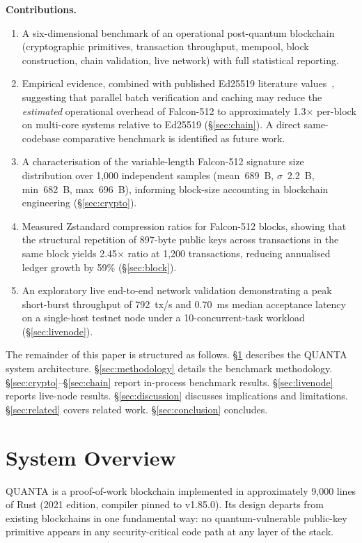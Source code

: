 \documentclass[11pt,a4paper]{article}
\begin{document}
\textbf{Contributions.}
\begin{enumerate}
  \item A six-dimensional benchmark of an operational post-quantum blockchain
        (cryptographic primitives, transaction throughput, mempool, block
        construction, chain validation, live network) with full statistical
        reporting.
  \item Empirical evidence, combined with published Ed25519 literature values~\cite{bernstein2012}, suggesting that parallel batch verification and caching may reduce the \emph{estimated} operational overhead of Falcon-512 to approximately 1.3$\times$ per-block on multi-core systems relative to Ed25519 (\S\ref{sec:chain}). A direct same-codebase comparative benchmark is identified as future work.
  \item A characterisation of the variable-length Falcon-512 signature size
        distribution over 1,000 independent samples (mean~689~B, $\sigma$~2.2~B,
        min~682~B, max~696~B), informing block-size accounting in blockchain
        engineering (\S\ref{sec:crypto}).
  \item Measured Zstandard compression ratios for Falcon-512 blocks, showing
        that the structural repetition of 897-byte public keys across
        transactions in the same block yields 2.45$\times$ ratio at 1,200
        transactions, reducing annualised ledger growth by 59\% (\S\ref{sec:block}).
  \item An exploratory live end-to-end network validation demonstrating a peak short-burst throughput of 792~tx/s and 0.70~ms median acceptance latency on a single-host testnet node under a 10-concurrent-task workload (\S\ref{sec:livenode}).
\end{enumerate}

The remainder of this paper is structured as follows.
\S\ref{sec:system} describes the QUANTA system architecture.
\S\ref{sec:methodology} details the benchmark methodology.
\S\ref{sec:crypto}--\S\ref{sec:chain} report in-process benchmark results.
\S\ref{sec:livenode} reports live-node results.
\S\ref{sec:discussion} discusses implications and limitations.
\S\ref{sec:related} covers related work.
\S\ref{sec:conclusion} concludes.

\section{System Overview}
\label{sec:system}
QUANTA is a proof-of-work blockchain implemented in approximately 9,000 lines
of Rust (2021 edition, compiler pinned to v1.85.0). Its design departs from
existing blockchains in one fundamental way: no quantum-vulnerable public-key
primitive appears in any security-critical code path at any layer of the stack.
\end{document}
